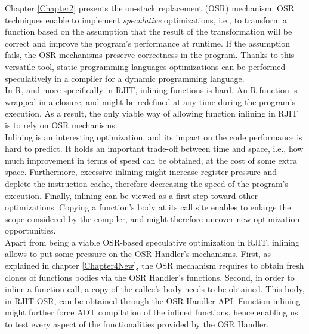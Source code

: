 Chapter \ref{Chapter2} presents the on-stack replacement (OSR) mechanism.
OSR techniques enable to implement \textit{speculative} optimizations, i.e., to transform a function based on the assumption that the result of the transformation will be correct and improve the program's performance at runtime.
If the assumption fails, the OSR mechanisms preserve correctness in the program.
Thanks to this versatile tool, static programming languages optimizations can be performed speculatively in a compiler for a dynamic programming language.\\

In R, and more specifically in RJIT, inlining functions is hard. 
An R function is wrapped in a closure, and might be redefined at any time during the program's execution.
As a result, the only viable way of allowing function inlining in RJIT is to rely on OSR mechanisms.\\

Inlining is an interesting optimization, and its impact on the code performance is hard to predict. 
It holds an important trade-off between time and space, i.e., how much improvement in terms of speed can be obtained, at the cost of some extra space.
Furthermore, excessive inlining might increase register pressure and deplete the instruction cache, therefore decreasing the speed of the program's execution.
Finally, inlining can be viewed as a first step toward other optimizations.
Copying a function's body at its call site enables to enlarge the scope considered by the compiler, and might therefore uncover new optimization opportunities.\\

Apart from being a viable OSR-based speculative optimization in RJIT, inlining allows to put some pressure on the OSR Handler's mechanisms.
First, as explained in chapter \ref{Chapter4New}, the OSR mechanism requires to obtain fresh clones of functions bodies via the OSR Handler's functions.
Second, in order to inline a function call, a copy of the callee's body needs to be obtained.
This body, in RJIT OSR, can be obtained through the OSR Handler API.
Function inlining might further force AOT compilation of the inlined functions, hence enabling us to test every aspect of the functionalities provided by the OSR Handler.\\

